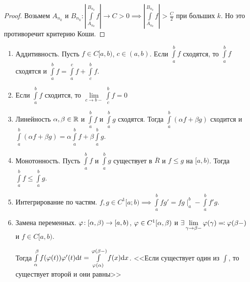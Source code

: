 \begin{proof}
    Возьмем $A_{n_k}$ и  $B_{n_k}\!: |\int\limits_{A_{n_k}}^{B_{n_k}} f| \to C > 0 \implies |\int\limits_{A_{n_k}}^{B_{n_k}} f| > \frac{C}{2}$ при больших $k$. Но это противоречит критерию Коши.
\end{proof}
\begin{properties}
    \begin{enumerate}
        \item Аддитивность. Пусть $f \in C[a, b)$,  $c \in (a, b)$. Если  $\int\limits_a^b f$ сходятся, то  $\int\limits_a^b f$ сходятся и  $\int\limits_a^b f = \int\limits_a^c f + \int\limits_c^b f$.
        \item Если $\int\limits_a^b f$ сходится, то  $\lim\limits_{c \to b-} \int\limits_c^b f = 0$
        \item Линейность $\alpha, \beta \in \mathbb{R}$ и $\int\limits_a^b f$ и  $\int\limits_a^b g$ сходятся. Тогда  $\int\limits_a^b(\alpha f + \beta g)$ сходится и $\int\limits_a^b (\alpha f + \beta g) = \alpha \int\limits_a^b f + \beta\int\limits_a^b g$.
        \item Монотонность. Пусть $\int\limits_a^b f$ и $\int\limits_a^b g$ существует в  $\overline{R}$ и  $f \le g$ на $[a, b)$. Тогда  $\int\limits_a^b f \le \int\limits_a^b g$.
        \item Интегрирование по частям. $f, g \in C^1[a; b) \implies \int\limits_a^b fg' = fg \mid_a^b - \int\limits_a^b f'g$.
        \item Замена переменных. $\varphi\!: [\alpha, \beta) \to [a, b)$,  $\varphi \in C^1[\alpha, \beta)$ и $\exists \lim\limits_{\gamma \to \beta-} \varphi(\gamma) \eqqcolon \varphi(\beta-)$ и $f \in C[a, b)$.

            Тогда  $\int\limits_\alpha^\beta f(\varphi(t)) \varphi'(t)\mathrm{d}t = \int\limits_{\varphi(\alpha)}^{\varphi(\beta-)} f(x) \mathrm{d}x$. <<Если существует один из  $\int$, то существует второй и они равны>>
    \end{enumerate}
\end{properties}

